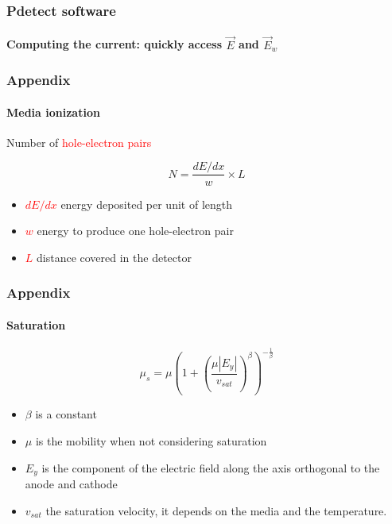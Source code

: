 \documentclass[14pt]{beamer}
\begin{document}
\begin{frame}
  \frametitle{Pdetect software}
  \framesubtitle{Computing the current: quickly access $\vec{E}$ and $\vec{E}_w$}


\end{frame}

\begin{frame}
  \frametitle{Appendix}
  \framesubtitle{Media ionization}

  Number of \textcolor{red}{hole-electron pairs}

  \[N = \frac{dE/dx}{w} \times L\]

\begin{itemize}
  \item \textcolor{red}{$dE/dx$} energy deposited per unit of length
  \item \textcolor{red}{$w$} energy to produce one hole-electron pair
  \item \textcolor{red}{$L$} distance covered in the detector
\end{itemize}

\end{frame}

\begin{frame}
  \frametitle{Appendix}
  \framesubtitle{Saturation}

  \begin{equation}
		\mu_s = \mu \left (1 + \left (\frac{\mu |E_y|}{v_{sat}} \right )^{\beta} \right )^{-\frac{1}{\beta}}
		\label{eq:saturation}
	\end{equation}

\begin{itemize}
  \item $\beta$ is a constant
  \item $\mu$ is the mobility when not considering saturation
  \item $E_y$ is the component of the electric field along the axis orthogonal
  to the anode and cathode
  \item $v_{sat}$ the saturation velocity, it depends on the media and the
  temperature.
\end{itemize}

\end{frame}
\end{document}
